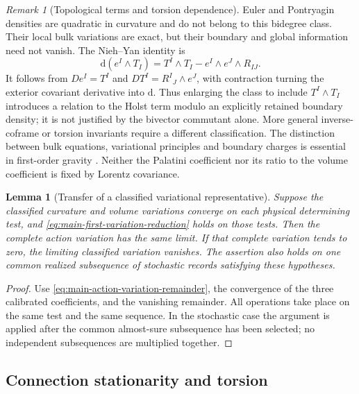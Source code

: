 \documentclass[11pt]{article}
\numberwithin{equation}{section}
\newtheorem{lemma}[lemma]{Lemma}
\theoremstyle{definition}
\theoremstyle{remark}
\newtheorem{remark}[remark]{Remark}
\newcommand{\dd}{\mathrm d}
\begin{document}
\begin{remark}[Topological terms and torsion dependence]
\label{rem:supp-topological-scope}
Euler and Pontryagin densities are quadratic in curvature and do not belong
to this bidegree class. Their local bulk variations are exact, but their
boundary and global information need not vanish. The Nieh--Yan identity is
\begin{equation}
 \dd(e^I\wedge T_I)
   =T^I\wedge T_I-e^I\wedge e^J\wedge R_{IJ}.
 \label{eq:supp-nieh-yan}
\end{equation}
It follows from $De^I=T^I$ and $DT^I=R^I{}_J\wedge e^J$, with contraction
turning the exterior covariant derivative into $\dd$. Thus enlarging the
class to include $T^I\wedge T_I$ introduces a relation to the Holst term
modulo an explicitly retained boundary density; it is not justified by the
bivector commutant alone. More general inverse-coframe or torsion invariants
require a different classification. The distinction between bulk equations,
variational principles and boundary charges is essential in first-order
gravity \cite{CorichiReview}. Neither the Palatini coefficient nor its ratio
to the volume coefficient is fixed by Lorentz covariance.
\end{remark}

\begin{lemma}[Transfer of a classified variational representative]
\label{lem:supp-variation-transfer}
Suppose the classified curvature and volume variations converge on each
physical determining test, and \eqref{eq:main-first-variation-reduction}
holds on those tests. Then the complete action variation has the same limit.
If that complete variation tends to zero, the limiting classified variation
vanishes. The assertion also holds on one common realized subsequence of
stochastic records satisfying these hypotheses.
\end{lemma}
\begin{proof}
Use \eqref{eq:main-action-variation-remainder}, the convergence of the three
calibrated coefficients, and the vanishing remainder. All operations take
place on the same test and the same sequence. In the stochastic case the
argument is applied after the common almost-sure subsequence has been
selected; no independent subsequences are multiplied together.
\end{proof}


\subsection{Connection stationarity and torsion}
\end{document}
